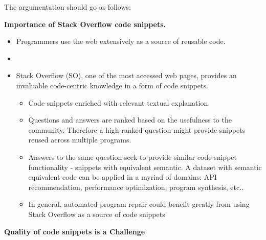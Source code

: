 


The argumentation should go as follows:


\textbf{Importance of Stack Overflow code snippets.}
\begin{itemize}
	\item Programmers use the web extensively as a source of reusable code.
	\item {}
	\item Stack Overflow (SO), one of the most accessed web pages, provides an invaluable code-centric knowledge in a form of code snippets. 
	
	\begin{itemize}
		\item Code snippets enriched with relevant textual explanation 
		\item Questions and answers are ranked based on the usefulness to the community. Therefore a high-ranked question might provide snippets reused across multiple programs. 
		\item Answers to the same question seek to provide similar code snippet functionality - snippets with equivalent semantic. A dataset with semantic equivalent code can be applied in a myriad of domains: API recommendation, performance optimization, program synthesis, etc..
		\item In general, automated program repair  could benefit greatly from using Stack Overflow as a source of code snippets 
	\end{itemize}
	
\end{itemize}	
	

\textbf{Quality of  code snippets is a Challenge}

